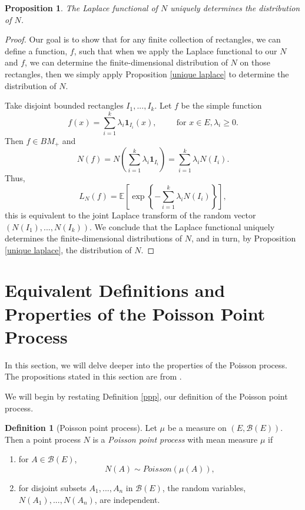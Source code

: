 \documentclass[11pt, oneside]{article}   	%
\newtheorem{proposition}{Proposition}[section]
\theoremstyle{definition}
\newtheorem{definition}{Definition}[section]
\theoremstyle{remark}
\begin{document}
\begin{proposition} \label{unique laplace pt2}
  The Laplace functional of $N$ uniquely determines the distribution of $N$.
\end{proposition}

\begin{proof}
  Our goal is to show that for any finite collection of rectangles, we can define a function, $f$, such that when we apply the Laplace functional to our $N$ and $f$, we can determine the finite-dimensional distribution of $N$ on those rectangles, then we simply apply Proposition \ref{unique laplace} to determine the distribution of $N$.

  Take disjoint bounded rectangles $I_1,...,I_k$. Let $f$ be the simple function
  $$f(x)=\sum_{i=1}^{k} \lambda_i \mathbf{1}_{I_i}(x), \hspace{1cm} \text{for } x \in E, \lambda_i \ge 0.$$
  Then $f \in BM_+$ and
  $$N(f)=N \left(\sum_{i=1}^k \lambda_i \mathbf{1}_{I_i}\right) = \sum_{i=1}^{k} \lambda_i N(I_i).$$
  Thus,
  $$L_N(f) = \mathbb{E}\left[ \exp \left\{ -\sum_{i=1}^k \lambda_i N(I_i) \right\} \right],$$
  this is equivalent to the joint Laplace transform of the random vector $(N(I_1),...,N(I_k))$. We conclude that the Laplace functional uniquely determines the finite-dimensional distributions of $N$, and in turn, by Proposition \ref{unique laplace}, the distribution of $N$.
\end{proof}












\newpage
\section{Equivalent Definitions and Properties of the Poisson Point Process}

In this section, we will delve deeper into the properties of the Poisson process. The propositions stated in this section are from \cite{resnick2005}. 

We will begin by restating Definition \ref{ppp}, our definition of the Poisson point process. 


\begin{definition}[Poisson point process] \label{pppcon}
  Let $\mu$ be a measure on $(E,\mathcal{B}(E))$. Then a point process $N$ is a \textit{Poisson point process} with mean measure $\mu$ if
  \begin{enumerate}[label=(\roman*)]
    \item
      for $A\in\mathcal{B}(E)$,
      $$N(A) \sim \textit{Poisson}(\mu(A)),$$
    \item for disjoint subsets $A_1,...,A_n$ in $\mathcal{B}(E)$, the random variables, $N(A_1),...,N(A_n)$, are independent.
  \end{enumerate}
\end{definition}
\end{document}
